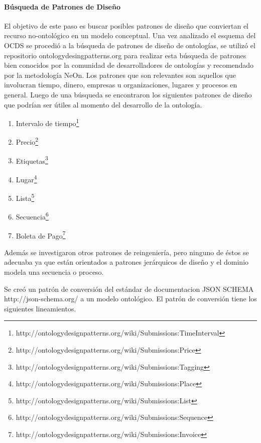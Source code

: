 \paragraph{Búsqueda de Patrones de Diseño}\hfill \break
El objetivo de este paso es buscar posibles patrones de diseño que conviertan el recurso no-ontológico en un modelo conceptual. 
Una vez analizado el esquema del OCDS se procedió a la búsqueda de patrones de diseño de ontologías, se utilizó el repositorio ontologydesingpatterns.org para realizar esta búsqueda de patrones bien conocidos por la comunidad de desarrolladores de ontologías y recomendado por la metodología NeOn.
Los patrones que son relevantes son aquellos que involucran tiempo, dinero, empresas u organizaciones, lugares y procesos en general. Luego de una búsqueda se encontraron los siguientes patrones de diseño que podrían ser útiles al momento del desarrollo de la ontología.
\begin{enumerate}
    \item Intervalo de tiempo\footnote{http://ontologydesignpatterns.org/wiki/Submissions:TimeInterval}
    \item Precio\footnote{http://ontologydesignpatterns.org/wiki/Submissions:Price} 
    \item Etiquetas\footnote{http://ontologydesignpatterns.org/wiki/Submissions:Tagging}
    \item Lugar\footnote{http://ontologydesignpatterns.org/wiki/Submissions:Place}
    \item Lista\footnote{http://ontologydesignpatterns.org/wiki/Submissions:List}
    \item Secuencia\footnote{http://ontologydesignpatterns.org/wiki/Submissions:Sequence}
    \item Boleta de Pago\footnote{http://ontologydesignpatterns.org/wiki/Submissions:Invoice} 
\end{enumerate}

Además se investigaron otros patrones de reingeniería, pero ninguno de éstos se adecuaba ya que están orientados a patrones jerárquicos de diseño y el dominio modela una secuencia o proceso. 

Se creó un patrón de conversión del estándar de documentacion JSON SCHEMA http://json-schema.org/ a un modelo ontológico. El patrón de conversión tiene los siguientes lineamientos.

